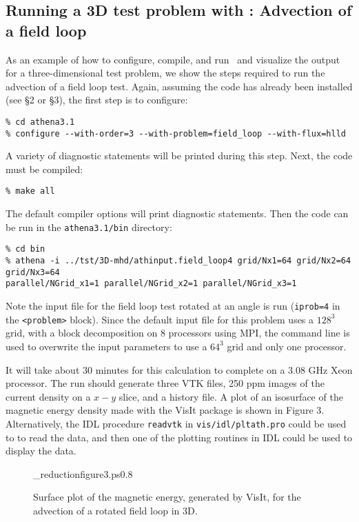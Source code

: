 \subsection{Running a 3D test problem with \ath: Advection of a field loop}

As an example of how to configure, compile, and run \ath\ and visualize
the output for a three-dimensional test problem, we show the steps required 
to run the advection of a field loop test.
Again, assuming the code has already been
installed (see \S2 or \S3), the first step is to configure:
\begin{verbatim}
% cd athena3.1
% configure --with-order=3 --with-problem=field_loop --with-flux=hlld
\end{verbatim}
A variety of diagnostic statements will be printed during
this step.  Next, the code must be compiled:
\begin{verbatim}
% make all
\end{verbatim}
The default compiler options will print diagnostic statements.  Then
the code can be run in the {\tt athena3.1/bin} directory: 
\begin{verbatim}
% cd bin
% athena -i ../tst/3D-mhd/athinput.field_loop4 grid/Nx1=64 grid/Nx2=64 grid/Nx3=64
parallel/NGrid_x1=1 parallel/NGrid_x2=1 parallel/NGrid_x3=1
\end{verbatim}
Note the input file for the field loop test rotated at an angle is run
({\tt iprob=4} in the {\tt <problem>} block).  Since the
default input file for this problem uses a $128^3$ grid, with a block
decomposition on 8 processors using MPI, the command line is used to overwrite
the input parameters to use a $64^3$ grid and only one processor.

It will take about 30 minutes for this calculation to complete on a 3.08 GHz
Xeon processor.  The run should generate three VTK files, 250 ppm
images of the current density on a $x-y$ slice, and a history file.
A plot of an isosurface
 of the magnetic energy density made with the VisIt package is
shown in Figure 3.  Alternatively, the IDL procedure {\tt readvtk}
in {\tt vis/idl/pltath.pro} could be used to to read the data, and then one
of the plotting routines in IDL could be used to display the data.

\begin{figure}[htb!]
\plotone_reduction{figure3.ps}{0.8}
\caption{Surface plot of the magnetic energy, generated by VisIt, for
the advection of a rotated field loop in 3D.}
\end{figure}

